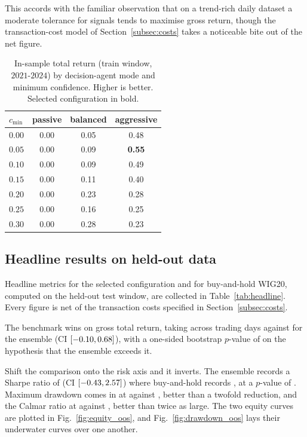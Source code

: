 This accords with the familiar observation that on a trend-rich daily dataset a moderate tolerance for signals tends to maximise gross return, though the transaction-cost model of Section~\ref{subsec:costs} takes a noticeable bite out of the net figure.

\begin{table}[!htbp]
\centering
\caption{In-sample total return (train window, $2021$-$2024$) by decision-agent mode and minimum confidence. Higher is better. Selected configuration in bold.}
\label{tab:grid_train}
\begin{tabular}{lccc}
\toprule
\textbf{$c_{\min}$} & \textbf{passive} & \textbf{balanced} & \textbf{aggressive} \\
\midrule
$0.00$ & 0.00 & 0.05 & 0.48 \\
$0.05$ & 0.00 & 0.09 & \textbf{0.55} \\
$0.10$ & 0.00 & 0.09 & 0.49 \\
$0.15$ & 0.00 & 0.11 & 0.40 \\
$0.20$ & 0.00 & 0.23 & 0.28 \\
$0.25$ & 0.00 & 0.16 & 0.25 \\
$0.30$ & 0.00 & 0.28 & 0.23 \\
\bottomrule
\end{tabular}
\end{table}

\subsection{Headline results on held-out data}\label{subsec:headline}

Headline metrics for the selected configuration and for buy-and-hold WIG20, computed on the held-out test window, are collected in Table~\ref{tab:headline}. Every figure is net of the transaction costs specified in Section~\ref{subsec:costs}.

The benchmark wins on gross total return, taking \BHtest{} across \OOSDays{} trading days against \TRtest{} for the ensemble (CI $[-0.10, 0.68]$), with a one-sided bootstrap $p$-value of \PvsBH{} on the hypothesis that the ensemble exceeds it.

Shift the comparison onto the risk axis and it inverts. The ensemble records a Sharpe ratio of \Shtest{} (CI $[-0.43, 2.57]$) where buy-and-hold records \BHsharpe{}, at a $p$-value of \PvsBHsharpe{}. Maximum drawdown comes in at \MDDtest{} against \MDDbh{}, better than a twofold reduction, and the Calmar ratio at \Calmtest{} against \Calmbh{}, better than twice as large. The two equity curves are plotted in Fig.~\ref{fig:equity_oos}, and Fig.~\ref{fig:drawdown_oos} lays their underwater curves over one another.

